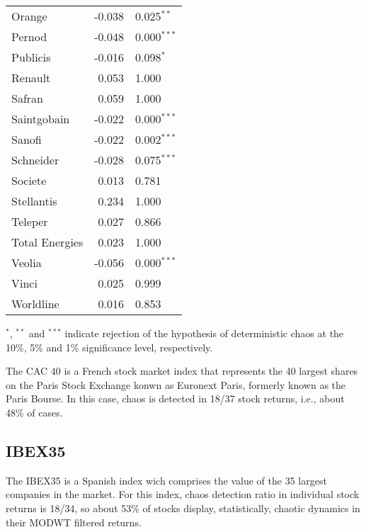 \documentclass[12pt]{article}
\begin{document}
\begin{table} [H]
\begin{tabular*}{\textwidth}{@{\extracolsep{\fill}}lrl}
        Orange                     & -0.038  & 0.025$^{**}$   \\ 
        Pernod                     & -0.048  & 0.000$^{***}$ \\ 
        Publicis                   & -0.016  & 0.098$^{*}$  \\ 
       	Renault                    & 0.053  &  1.000 \\ 
        Safran                     & 0.059 &  1.000\\ 
				Saintgobain                & -0.022  &  0.000$^{***}$ \\
        Sanofi                     & -0.022 &  0.002$^{***}$ \\ 
        Schneider                  & -0.028 & 0.075$^{***}$   \\ 
        Societe                    & 0.013  &   0.781 \\ 
        Stellantis                 & 0.234  &  1.000  \\    
        Teleper                    & 0.027  &   0.866\\ 
        Total Energies             &  0.023 &  1.000 \\ 
        Veolia                     & -0.056 & 0.000$^{***}$  \\ 
        Vinci                      & 0.025  &  0.999 \\ 
        Worldline                  &  0.016 &  0.853 \\ 
        \hline      
    \end{tabular*}
        {$^{*}$, $^{**}$ and $^{***}$ indicate rejection of the hypothesis of  deterministic chaos at the 10\%, 5\% and 1\% significance level, respectively.}
\end{table}

The CAC 40 is a French stock market index that represents the 40 largest 
shares on the Paris Stock Exchange konwn as Euronext Paris, formerly known as the Paris Bourse. 
In this case, chaos is detected in 18/37 stock returns, i.e., about 48\% of cases.



\subsection{IBEX35}

The IBEX35 is a Spanish index wich comprises the value of the 35 largest companies in the market.
For this index, chaos detection ratio in individual stock returns is 18/34, so about 53\% of stocks display, statistically, chaotic dynamics in their 
MODWT filtered returns.
\end{document}
